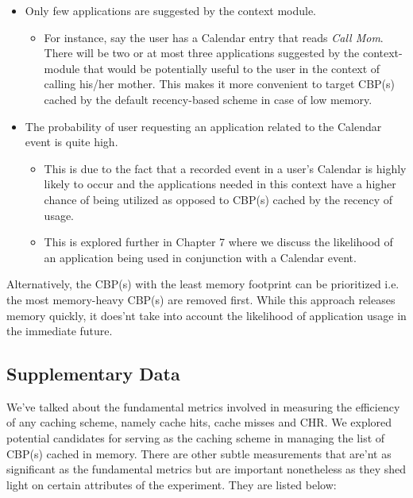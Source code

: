 \documentclass[12pt]{uthesis-v12}  %
\begin{document}
					\begin{itemize}
						
						\item Only few applications are suggested by the context module.
						
							\begin{itemize}
								\item For instance, say the user has a Calendar entry that reads {\em Call Mom}. There will be two or at most three applications suggested by the context-module that would be potentially useful to the user in the context of calling his/her mother. This makes it more convenient to target CBP(s) cached by the default recency-based scheme in case of low memory.
							\end{itemize}
							
						\item The probability of user requesting an application related to the Calendar event is quite high.
						
							\begin{itemize}
								
								\item This is due to the fact that a recorded event in a user's Calendar is highly likely to occur and the applications needed in this context have a higher chance of being utilized as opposed to CBP(s) cached by the recency of usage.
								
								\item This is explored further in Chapter 7 where we discuss the likelihood of an application being used in conjunction with a Calendar event.
								
							\end{itemize}
								
					\end{itemize}  
					
					Alternatively, the CBP(s) with the least memory footprint can be prioritized i.e. the most memory-heavy CBP(s) are removed first. While this approach releases memory quickly, it does'nt take into account the likelihood of application usage in the immediate future.
					
		\subsection{Supplementary Data}
			We've talked about the fundamental metrics involved in measuring the efficiency of any caching scheme, namely cache hits, cache misses and CHR. We explored potential candidates for serving as the caching scheme in managing the list of CBP(s) cached in memory. There are other subtle measurements that are'nt as significant as the fundamental metrics but are important nonetheless as they shed light on certain attributes of the experiment. They are listed below:
			
\end{document}
